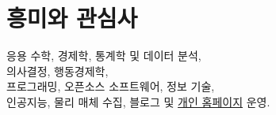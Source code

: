 \documentclass[a4paper]{article} %
\begin{document}

\section{흥미와 관심사}

응용 수학, 경제학, 통계학 및 데이터 분석,\\
의사결정, 행동경제학,\\
프로그래밍, 오픈소스 소프트웨어, 정보 기술,\\
인공지능, 물리 매체 수집, 블로그 및 \href{https://www.kobm.xyz}{개인 홈페이지} 운영.

\end{document}
